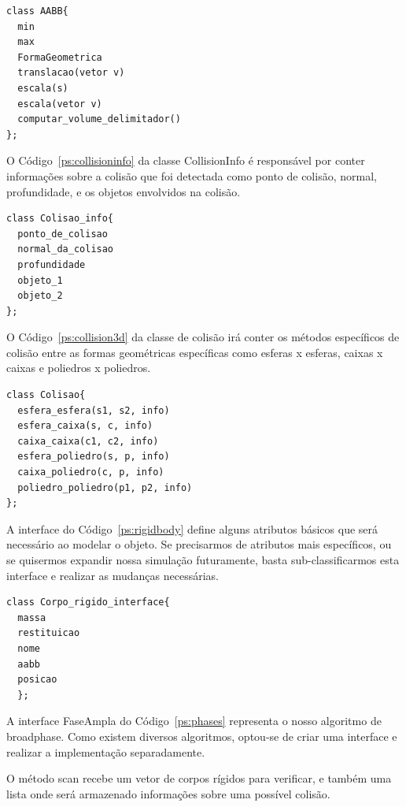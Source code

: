 \begin{lstlisting}[frame=single,caption=Modelagem prévia para AABB\label{ps:aabb}]
class AABB{
  min
  max
  FormaGeometrica
  translacao(vetor v)
  escala(s)
  escala(vetor v)
  computar_volume_delimitador()
};
\end{lstlisting}


O Código~\ref{ps:collisioninfo} da classe CollisionInfo é responsável por conter informações sobre a colisão que foi detectada como ponto de colisão, normal, profundidade, e os objetos envolvidos na colisão.


\begin{lstlisting}[frame=single,caption=Modelagem prévia para coletor de informações\label{ps:collisioninfo}]
class Colisao_info{
  ponto_de_colisao
  normal_da_colisao
  profundidade
  objeto_1
  objeto_2
};
\end{lstlisting}

O Código~\ref{ps:collision3d} da classe de colisão irá conter os métodos específicos de colisão entre as formas geométricas específicas como esferas x esferas, caixas x caixas e poliedros x poliedros.

\begin{lstlisting}[frame=single,caption=Modelagem prévia para classe estática para colisões\label{ps:collision3d}]
class Colisao{
  esfera_esfera(s1, s2, info)
  esfera_caixa(s, c, info)
  caixa_caixa(c1, c2, info)
  esfera_poliedro(s, p, info)
  caixa_poliedro(c, p, info)
  poliedro_poliedro(p1, p2, info)
};
\end{lstlisting}


A interface do Código~\ref{ps:rigidbody} define alguns atributos básicos que será necessário ao modelar o objeto. Se precisarmos de atributos mais específicos, ou se quisermos expandir nossa simulação futuramente, basta sub-classificarmos esta interface e realizar as mudanças necessárias.

\begin{lstlisting}[frame=single,caption=Modelagem prévia para interface de corpo rígido\label{ps:rigidbody}]
class Corpo_rigido_interface{
  massa
  restituicao
  nome
  aabb
  posicao
  };
\end{lstlisting}


A interface FaseAmpla do Código~\ref{ps:phases} representa o nosso algoritmo de broadphase. Como existem diversos algoritmos, optou-se de criar uma interface e realizar a implementação separadamente.

O método scan recebe um vetor de corpos rígidos para verificar, e também uma lista onde será armazenado informações sobre uma possível colisão.

